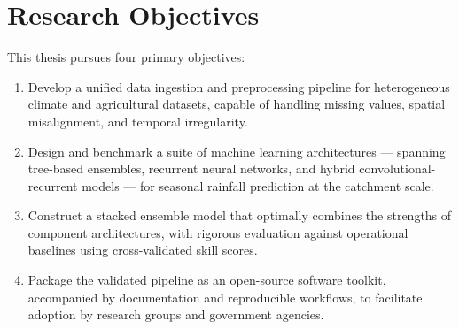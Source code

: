 \section{Research Objectives}

This thesis pursues four primary objectives:

\begin{enumerate}[label=RO\arabic*:,leftmargin=*]
  \item Develop a unified data ingestion and preprocessing pipeline for
        heterogeneous climate and agricultural datasets, capable of handling
        missing values, spatial misalignment, and temporal irregularity.
  \item Design and benchmark a suite of machine learning architectures ---
        spanning tree-based ensembles, recurrent neural networks, and hybrid
        convolutional-recurrent models --- for seasonal rainfall prediction
        at the catchment scale.
  \item Construct a stacked ensemble model that optimally combines the
        strengths of component architectures, with rigorous evaluation against
        operational baselines using cross-validated skill scores.
  \item Package the validated pipeline as an open-source software toolkit,
        accompanied by documentation and reproducible workflows, to facilitate
        adoption by research groups and government agencies.
\end{enumerate}

